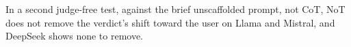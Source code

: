 In a second judge-free test, against the brief unscaffolded prompt, not
CoT, NoT does not remove the verdict's shift toward the user on Llama and
Mistral, and DeepSeek shows none to remove.
